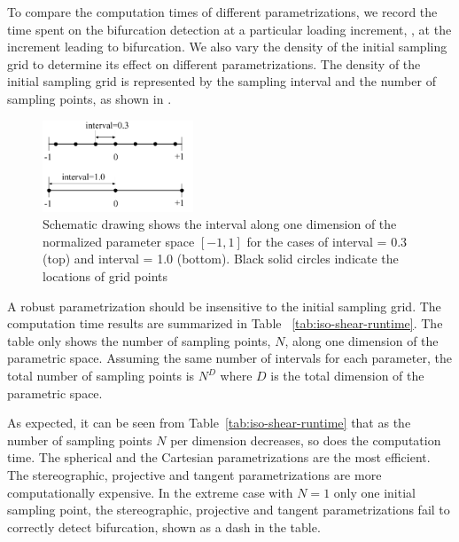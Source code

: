 \documentclass[12pt]{article}
\numberwithin{equation}{section}
\begin{document}
To compare the computation times of different parametrizations, we
record the time spent on the bifurcation detection at a particular
loading increment, \eg, at the increment leading to bifurcation. We
also vary the density of the initial sampling grid to determine its
effect on different parametrizations. The density of the initial
sampling grid is represented by the sampling interval and the number
of sampling points, as shown in .

\begin{figure}[!htbp]
  \centering 
    \includegraphics[width=0.4\textwidth]
                    {figs/interval_scheme.pdf}
  \caption{Schematic drawing shows the interval along one dimension 
  of the normalized parameter space $[-1, 1]$ for the cases 
  of interval = 0.3 (top) and interval = 1.0 (bottom). Black solid 
  circles indicate the locations of grid points}
  \label{fig:interval_scheme}
\end{figure}

A robust parametrization should be insensitive to the initial sampling
grid. The computation time results are summarized in Table~
\ref{tab:iso-shear-runtime}. The table only shows the number of
sampling points, $N$, along one dimension of the parametric space.
Assuming the same number of intervals for each parameter, the total
number of sampling points is $N^{D}$ where $D$ is the total dimension
of the parametric space.

As expected, it can be seen from Table~\ref{tab:iso-shear-runtime}
that as the number of sampling points $N$ per dimension decreases, so
does the computation time. The spherical and the Cartesian
parametrizations are the most efficient. The stereographic, projective
and tangent parametrizations are more computationally expensive. In
the extreme case with $N=1$ \ie only one initial sampling point, the
stereographic, projective and tangent parametrizations fail to
correctly detect bifurcation, shown as a dash in the table.
\end{document}
